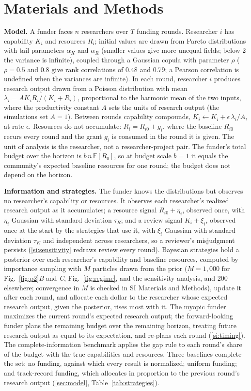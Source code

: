 \documentclass[article, 11pt, reqno]{amsart}
\theoremstyle{named}
\begin{document}
\section*{Materials and Methods}
\textbf{Model.} A funder faces $n$ researchers over $T$ funding rounds. Researcher $i$ has capability $K_i$ and resources $R_i$; initial values are drawn from Pareto distributions with tail parameters $\alpha_K$ and $\alpha_R$ (smaller values give more unequal fields; below 2 the variance is infinite), coupled through a Gaussian copula with parameter $\rho$ ($\rho = 0.5$ and $0.8$ give rank correlations of 0.48 and 0.79; a Pearson correlation is undefined when the variances are infinite). In each round, researcher $i$ produces research output drawn from a Poisson distribution with mean $\lambda_i = AK_iR_i/(K_i + R_i)$, proportional to the harmonic mean of the two inputs, where the productivity constant $A$ sets the units of research output (the simulations set $A = 1$). Between rounds capability compounds, $K_i \leftarrow K_i + \epsilon\,\lambda_i/A$, at rate $\epsilon$. Resources do not accumulate: $R_i = R_{i0} + g_i$, where the baseline $R_{i0}$ recurs every round and the grant $g_i$ is consumed in the round it is given. The unit of analysis is the researcher, not a researcher-project pair. The funder's total budget over the horizon is $b\,n\,\mathbb{E}[R_0]$, so at budget scale $b = 1$ it equals the community's expected baseline resources for one round; the budget does not depend on the horizon.

\textbf{Information and strategies.} The funder knows the distributions but observes no researcher's capability or resources. It observes each researcher's realized research output as it accumulates; a resource signal $R_{i0} + \eta_i$, observed once, with $\eta_i$ Gaussian with standard deviation $\tau_R$; and a review signal $K_i + \xi_i$, observed once at the start by the strategies that use it, with $\xi_i$ Gaussian with standard deviation $\tau_K$ and independent across researchers, so a reviewer's misjudgment persists (\ref{si:sensitivity} redraws review every round). Bayesian strategies hold a posterior over each researcher's capability and baseline resources, computed by importance sampling with $M$ particles drawn from the prior ($M = 1{,}000$ for Fig.~\ref{fig:p2}\textit{B} and \textit{C}, Fig.~\ref{fig:regime}, and the sensitivity analysis, and $200$ elsewhere; convergence in $M$ is checked in SI Materials and Methods), update it after each round, and allocate each dollar to the researcher whose expected research output, given the posterior, rises most with it. The myopic funder maximizes the current round's expected research output; the forward-looking funder plans the remaining budget over the remaining horizon, treating future research output as equal to its expectation, and re-plans each round (\ref{si:timing}). The complete-information benchmark applies the gap rule to each round's share of the budget with the true capabilities and resources. Three baselines complete the set: no funding, against which every result is normalized; uniform funding; and track-record funding, which allocates in proportion to the previous round's research output (\ref{sec:model}, Table~\ref{tab:strategies}).
\end{document}

